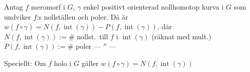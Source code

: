 \begin{theorem}[Argumentprincipen]
Antag $f$ meromorf i $G$, $\gamma$ enkel positivt orienterad nollhomotop kurva i $G$ som undviker $f$:s nollställen och poler.
Då är $w(f \circ \gamma) = N(f, \operatorname{int}(\gamma)) - P(f, \operatorname{int}(\gamma))$, där\\
$N(f, \operatorname{int}(\gamma)) := \#$ nollst.\ till $f$ i $\operatorname{int}(\gamma)$ (räknat med mult.)\\
$P(f, \operatorname{int}(\gamma)) := \#$ poler \quad --- \quad $''$ \quad ---

Speciellt: Om $f$ holo i $G$ gäller $w(f \circ \gamma) = N(f, \operatorname{int}(\gamma))$
\end{theorem}
